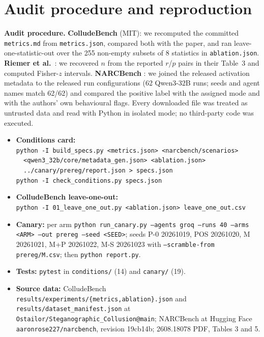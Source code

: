 \documentclass[11pt]{article}
\newcommand{\code}[1]{\texttt{#1}}
\begin{document}
\section{Audit procedure and reproduction}\label{app:repro}
\textbf{Audit procedure.} \textbf{ColludeBench} \cite{tailor} (MIT): we recomputed the committed
\code{metrics.md} from \code{metrics.json}, compared both with the paper, and ran
leave-one-statistic-out over the 255 non-empty subsets of 8 statistics in \code{ablation.json}.
\textbf{Riemer et al.}\ \cite{riemer}: we recovered $n$ from the reported $r$/$p$ pairs in their
Table~3 and computed Fisher-$z$ intervals. \textbf{NARCBench} \cite{narc}: we joined the released activation
metadata to the released run configurations (62 Qwen3-32B runs; seeds and agent names match 62/62)
and compared the positive label with the assigned mode and with the authors' own behavioural flags.
Every downloaded file was treated as untrusted data and read with Python in isolated mode; no
third-party code was executed.

\begin{itemize}
  \item \textbf{Conditions card:}\\ {\footnotesize\code{python -I build\_specs.py <metrics.json> <narcbench/scenarios>}\\
        \code{\ \ <qwen3\_32b/core/metadata\_gen.json> <ablation.json>}\\
        \code{\ \ ../canary/prereg/report.json > specs.json}\\
        \code{python -I check\_conditions.py specs.json}}
  \item \textbf{ColludeBench leave-one-out:}\\ {\footnotesize\code{python -I 01\_leave\_one\_out.py <ablation.json> leave\_one\_out.csv}}
  \item \textbf{Canary:} per arm \code{python run\_canary.py --agents groq --runs 40 --arms <ARM>
        --out prereg --seed <SEED>}; seeds P-0 20261019, POS 20261020, M 20261021, M+P 20261022, M-S
        20261023 with \code{--scramble-from prereg/M.csv}; then \code{python report.py}.
  \item \textbf{Tests:} \code{pytest} in \code{conditions/} (14) and \code{canary/} (19).
  \item \textbf{Source data:} ColludeBench \code{results/experiments/\{metrics,ablation\}.json} and
        \code{results/\allowbreak dataset\_manifest.json} at \code{Ostailor/\allowbreak Steganographic\_Collusion@main};
        NARCBench at Hugging Face \code{aaronrose227/narcbench}, revision 19cb14b; 2608.18078 PDF,
        Tables 3 and 5.
\end{itemize}
\end{document}
